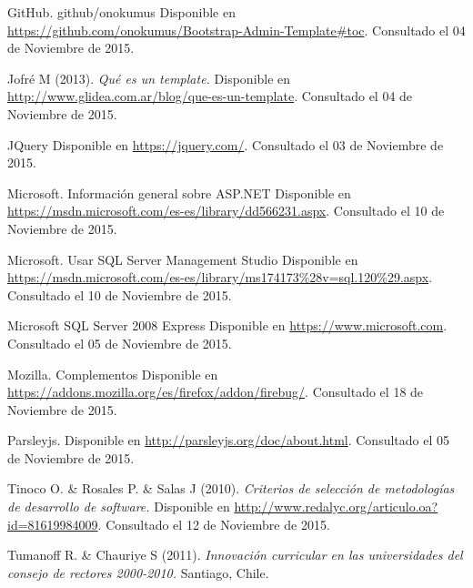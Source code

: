 \begin{spacing}{1.0}
\begin{thebibliography}{99}
\newblock GitHub. github/onokumus
\newblock Disponible en \url{https://github.com/onokumus/Bootstrap-Admin-Template#toc}.
\newblock Consultado el 04 de Noviembre de 2015.

\newblock Jofré M (2013).
\newblock \textit{Qué es un template.}
\newblock Disponible en \url{http://www.glidea.com.ar/blog/que-es-un-template}.
\newblock Consultado el 04 de Noviembre de 2015.

\newblock JQuery
\newblock Disponible en \url{https://jquery.com/}.
\newblock Consultado el 03 de Noviembre de 2015.



\newblock Microsoft.
\newblock Información general sobre ASP.NET
\newblock Disponible en \url{https://msdn.microsoft.com/es-es/library/dd566231.aspx}.
\newblock Consultado el 10 de Noviembre de 2015.


\newblock Microsoft. 
\newblock Usar SQL Server Management Studio
\newblock Disponible en \url{https://msdn.microsoft.com/es-es/library/ms174173%28v=sql.120%29.aspx}.
\newblock Consultado el 10 de Noviembre de 2015.

\newblock Microsoft SQL Server 2008 Express 
\newblock Disponible en \url{https://www.microsoft.com}.
\newblock Consultado el 05 de Noviembre de 2015.

\newblock Mozilla. Complementos
\newblock Disponible en \url{https://addons.mozilla.org/es/firefox/addon/firebug/}.
\newblock Consultado el 18 de Noviembre de 2015.




\newblock Parsleyjs.
\newblock Disponible en \url{http://parsleyjs.org/doc/about.html}.
\newblock Consultado el 05 de Noviembre de 2015.



\newblock Tinoco O. \& Rosales P. \& Salas J (2010).
\newblock \textit{Criterios de selección de metodologías de desarrollo de software.}
\newblock Disponible en \url{http://www.redalyc.org/articulo.oa?id=81619984009}.
\newblock Consultado el 12 de Noviembre de 2015.


\newblock Tumanoff R. \& Chauriye S (2011).
\newblock \textit{Innovación curricular en las universidades del consejo de rectores 2000-2010.} 
\newblock Santiago, Chile. 



































\end{thebibliography}
\end{spacing}
